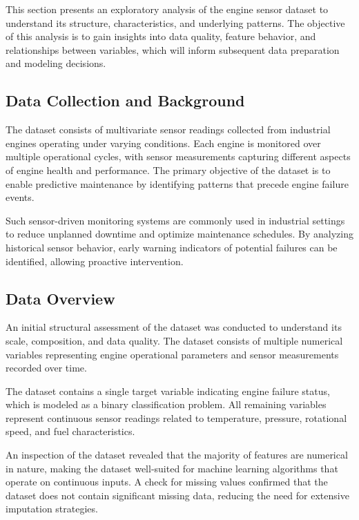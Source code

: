 \documentclass[11pt,a4paper]{article}
\begin{document}
This section presents an exploratory analysis of the engine sensor dataset to understand its structure, characteristics, and underlying patterns. The objective of this analysis is to gain insights into data quality, feature behavior, and relationships between variables, which will inform subsequent data preparation and modeling decisions.

\subsection{Data Collection and Background}

The dataset consists of multivariate sensor readings collected from industrial engines operating under varying conditions. Each engine is monitored over multiple operational cycles, with sensor measurements capturing different aspects of engine health and performance. The primary objective of the dataset is to enable predictive maintenance by identifying patterns that precede engine failure events.

Such sensor-driven monitoring systems are commonly used in industrial settings to reduce unplanned downtime and optimize maintenance schedules. By analyzing historical sensor behavior, early warning indicators of potential failures can be identified, allowing proactive intervention.

\subsection{Data Overview}


An initial structural assessment of the dataset was conducted to understand its scale, composition, and data quality. The dataset consists of multiple numerical variables representing engine operational parameters and sensor measurements recorded over time.

The dataset contains a single target variable indicating engine failure status, which is modeled as a binary classification problem. All remaining variables represent continuous sensor readings related to temperature, pressure, rotational speed, and fuel characteristics.

An inspection of the dataset revealed that the majority of features are numerical in nature, making the dataset well-suited for machine learning algorithms that operate on continuous inputs. A check for missing values confirmed that the dataset does not contain significant missing data, reducing the need for extensive imputation strategies.
\end{document}
